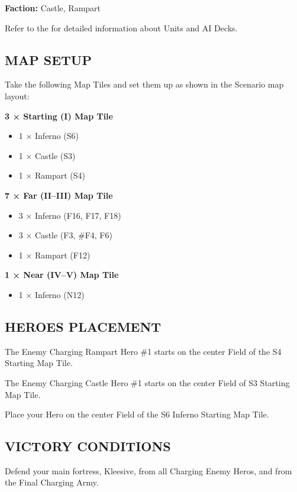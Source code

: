 \begin{multicols}{2}
\textbf{Faction:} Castle, Rampart

Refer to the  for detailed information about Units and AI Decks.

\subsection*{\MakeUppercase{Map Setup}}

Take the following Map Tiles and set them up as shown in the Scenario map layout:

\textbf{3 × Starting (I) Map Tile}
\begin{itemize}
  \item 1 × Inferno (S6)
  \item 1 × Castle (S3)
  \item 1 × Rampart (S4)
\end{itemize}

\textbf{7 × Far (II--III) Map Tile}
\begin{itemize}
  \item 3 × Inferno (F16, F17, F18)
  \item 3 × Castle (F3, \#F4, F6)
  \item 1 × Rampart (F12)
\end{itemize}

\textbf{1 × Near (IV--V) Map Tile}
\begin{itemize}
  \item 1 × Inferno (N12)
\end{itemize}

\subsection*{\MakeUppercase{Heroes Placement}}

The Enemy Charging Rampart Hero \#1 starts on the center Field of the S4 Starting Map Tile.

The Enemy Charging Castle Hero \#1 starts on the center Field of S3 Starting Map Tile.

Place your Hero on the center Field of the S6 Inferno Starting Map Tile.

\subsection*{\MakeUppercase{Victory Conditions}}

Defend your main fortress, Kleesive, from all Charging Enemy Heros, and from the Final Charging Army.


\end{multicols}
